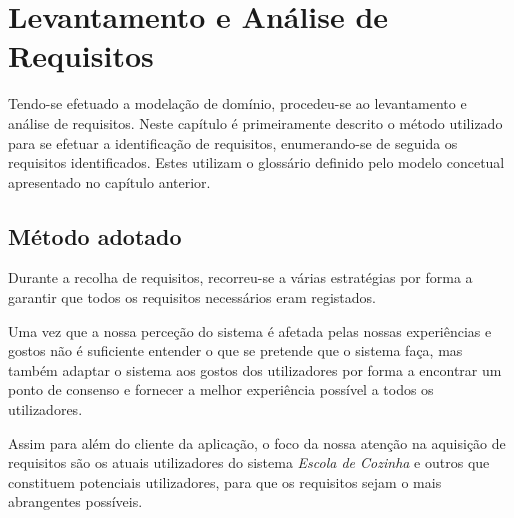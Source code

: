 
\section{Levantamento e Análise de Requisitos}
\label{cap:requisitos}

Tendo-se efetuado a modelação de domínio, procedeu-se ao levantamento e análise de requisitos. Neste capítulo é primeiramente descrito o método utilizado para se efetuar a identificação de requisitos, enumerando-se de seguida os requisitos identificados. Estes utilizam o glossário definido pelo modelo concetual apresentado no capítulo anterior.





\subsection{Método adotado}
\label{sec:requisitos:metodo}

Durante a recolha de requisitos, recorreu-se a várias estratégias por forma a garantir que todos os requisitos necessários eram registados.

Uma vez que a nossa perceção do sistema é afetada pelas nossas experiências e gostos não é suficiente entender o que se pretende que o sistema faça, mas também adaptar o sistema aos gostos dos utilizadores por forma a encontrar um ponto de consenso e fornecer a melhor experiência possível a todos os utilizadores.

Assim para além do cliente da aplicação, o foco da nossa atenção na aquisição de requisitos são os atuais utilizadores do sistema \emph{Escola de Cozinha} e outros que constituem potenciais utilizadores, para que os requisitos sejam o mais abrangentes possíveis.

